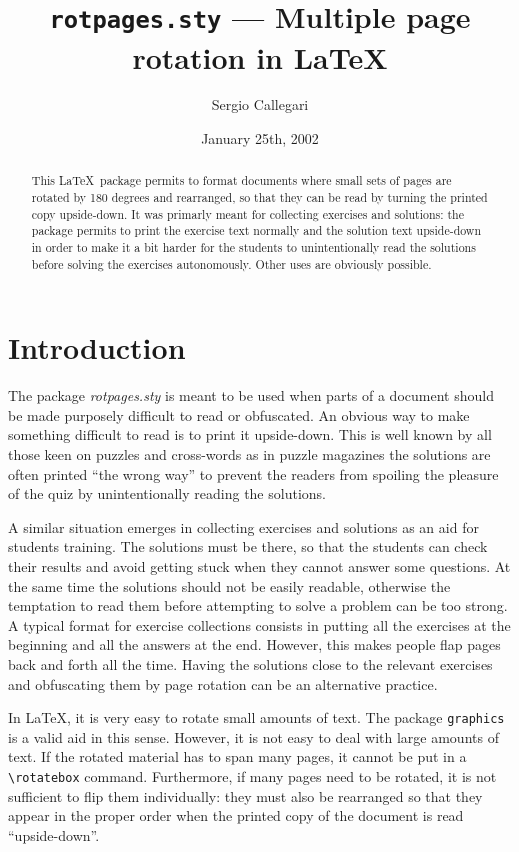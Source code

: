\documentclass[12pt,twocolumn]{article}
\title{\texttt{rotpages.sty} --- Multiple page rotation in \LaTeX}
\author{Sergio Callegari}
\date{January 25th, 2002}
\begin{document}
\maketitle
\thispagestyle{empty}

\begin{abstract}
  This \LaTeX\ package permits to format documents where small sets of
  pages are rotated by 180 degrees and rearranged, so that they can be
  read by turning the printed copy upside-down. It was primarly meant
  for collecting exercises and solutions: the package permits to print
  the exercise text normally and the solution text upside-down in
  order to make it a bit harder for the students to unintentionally
  read the solutions before solving the exercises autonomously. Other
  uses are obviously possible.
\end{abstract}


\section{Introduction}
The package \emph{rotpages.sty} is meant to be used when parts of a
document should be made purposely difficult to read or obfuscated.  An
obvious way to make something difficult to read is to print it
upside-down. This is well known by all those keen on puzzles and
cross-words as in puzzle magazines the solutions are often printed
``the wrong way'' to prevent the readers from spoiling the
pleasure of the quiz by unintentionally reading the solutions.
  
A similar situation emerges in collecting exercises and solutions as
an aid for students training. The solutions must be there, so that the
students can check their results and avoid getting stuck when they
cannot answer some questions. At the same time the solutions should
not be easily readable, otherwise the temptation to read them before
attempting to solve a problem can be too strong. A typical format for
exercise collections consists in putting all the exercises at the
beginning and all the answers at the end.  However, this makes people
flap pages back and forth all the time.  Having the solutions close to
the relevant exercises and obfuscating them by page rotation can
be an alternative practice.

In \LaTeX, it is very easy to rotate small amounts of text. The package
\texttt{graphics} is a valid aid in this sense. However, it is not easy
to deal with large amounts of text. If the rotated material has to
span many pages, it cannot be put in a \verb|\rotatebox| command.
Furthermore, if many pages need to be rotated, it is not sufficient to
flip them individually: they must also be rearranged so that they
appear in the proper order when the printed copy of the document is
read ``upside-down''.
\end{document}
